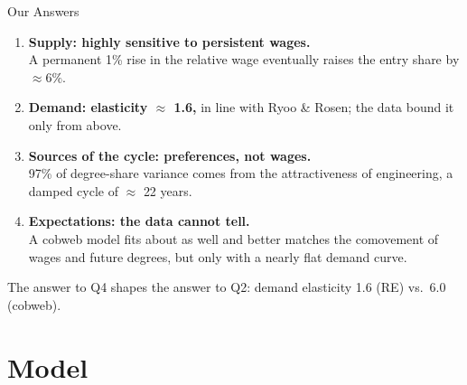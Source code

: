\documentclass[10pt]{beamer}
\begin{document}
\begin{frame}{Our Answers}
  \begin{enumerate}
    \item \textbf{Supply: highly sensitive to persistent wages.}\\
      A permanent 1\% rise in the relative wage eventually raises the entry share by \alert{$\approx 6\%$}.
    \vspace{0.15cm}
    \item \textbf{Demand: elasticity $\approx$ 1.6,} in line with Ryoo \& Rosen; the data bound it only from above.
    \vspace{0.15cm}
    \item \textbf{Sources of the cycle: preferences, not wages.}\\
      \alert{97\%} of degree-share variance comes from the attractiveness of engineering, a damped cycle of $\approx$ \alert{22 years}.
    \vspace{0.15cm}
    \item \textbf{Expectations: the data cannot tell.}\\
      A cobweb model fits about as well and better matches the comovement of wages and future degrees, but only with a nearly flat demand curve.
  \end{enumerate}
  \vspace{0.2cm}
  {\small The answer to Q4 shapes the answer to Q2: demand elasticity \alert{1.6 (RE) vs.\ 6.0 (cobweb)}.}
\end{frame}

\section{Model}
\end{document}
